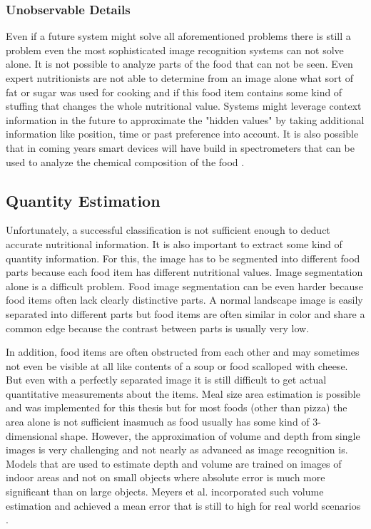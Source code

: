 \subsubsection*{Unobservable Details}
Even if a future system might solve all aforementioned problems there is still a problem even the most sophisticated image recognition systems can not solve alone. It is not possible to analyze parts of the food that can not be seen. Even expert nutritionists are not able to determine from an image alone what sort of fat or sugar was used for cooking and if this food item contains some kind of stuffing that changes the whole nutritional value. Systems might leverage context information in the future to approximate the "hidden values" by taking additional information like position, time or past preference into account. It is also possible that in coming years smart devices will have build in spectrometers that can be used to analyze the chemical composition of the food \cite{Krem}.

\subsection*{Quantity Estimation}
Unfortunately, a successful classification is not sufficient enough to deduct accurate nutritional information. It is also important to extract some kind of quantity information. For this, the image has to be segmented into different food parts because each food item has different nutritional values. Image segmentation alone is a difficult problem. Food image segmentation can be even harder because food items often lack clearly distinctive parts. A normal landscape image is easily separated into different parts but food items are often similar in color and share a common edge because the contrast between parts is usually very low. 

In addition, food items are often obstructed from each other and may sometimes not even be visible at all like contents of a soup or food scalloped with cheese. But even with a perfectly separated image it is still difficult to get actual quantitative measurements about the items. Meal size area estimation is possible and was implemented for this thesis but for most foods {(other than pizza)} the area alone is not sufficient inasmuch as food usually has some kind of 3-dimensional shape. However, the approximation of volume and depth from single images is very challenging and not nearly as advanced as image recognition is. Models that are used to estimate depth and volume are trained on images of indoor areas \cite{Eigen2015} and not on small objects where absolute error is much more significant than on large objects. Meyers et al. incorporated such volume estimation and achieved a mean error that is still to high for real world scenarios \cite{Meyers2015}. 

